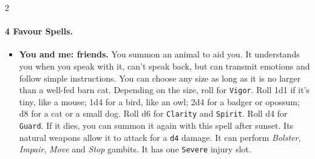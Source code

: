 \begin{multicols*}{2}
\paragraph{4 Favour Spells.}

\begin{itemize}[nosep, leftmargin=*]
    \item[\ding{108}] \textbf{You and me: friends.} You summon an animal to aid you. 
    It understands you when you speak with it, can't speak back, but can transmit emotions and follow simple instructions. 
    You can choose any size as long as it is no larger than a well-fed barn cat. 
    Depending on the size, roll for \texttt{Vigor}. Roll 1d1 if it's tiny, like a mouse; 1d4 for a bird, like an owl; 2d4 for a badger or opossum; d8 for a cat or a small dog. 
    Roll d6 for \texttt{Clarity} and \texttt{Spirit}. Roll d4 for \texttt{Guard}. If it dies, you can summon it again with this spell after sunset. 
    Its natural weapons allow it to attack for a \texttt{d4} damage. It can perform \emph{Bolster}, \emph{Impair}, \emph{Move} and \emph{Stop} gambits.
    It has one \texttt{Severe} injury slot.
\end{itemize}

\end{multicols*}
